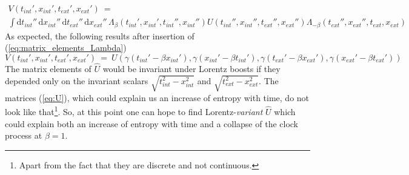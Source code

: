 \documentclass[12pt]{article}
\begin{document}
\begin{equation}
\begin{gathered}
V(t_{int}',x_{int}',t_{ext}',x_{ext}')\ =\ \\
\int \mathrm{d}t_{int}''\,\mathrm{d}x_{int}''\, \mathrm{d}t_{ext}''\,\mathrm{d}x_{ext}''\, 
\Lambda_\beta(t_{int}',x_{int}',t_{int}'',x_{int}'') 
U(t_{int}'',x_{int}'',t_{ext}'',x_{ext}'') 
\Lambda_{-\beta}(t_{ext}'',x_{ext}'',t_{ext},x_{ext})
\end{gathered}
\end{equation}
As expected, the following results after insertion of (\ref{eq:matrix_elements_Lambda})
\begin{equation}
V(t_{int}',x_{int}',t_{ext}',x_{ext}')\ =\ 
U(\gamma(t_{int}'-\beta x_{int}'),
\gamma(x_{int}'-\beta t_{int}'),
\gamma(t_{ext}'-\beta x_{ext}'),
\gamma(x_{ext}'-\beta t_{ext}')) 
\end{equation}
The matrix elements of $\hat{U}$ would be invariant under Lorentz boosts if they depended only on the invariant scalars $\sqrt{t_{int}^2-x_{int}^2}$ and $\sqrt{t_{ext}^2-x_{ext}^2}$. The matrices (\ref{eq:U}), which could explain us an increase of entropy with time, do not look like that\footnote{Apart from the fact that they are discrete and not continuous.}. So, at this point one can hope to find Lorentz-\emph{variant} $\hat{U}$ which could explain both an increase of entropy with time and a collapse of the clock process at $\beta=1$.



\end{document}
